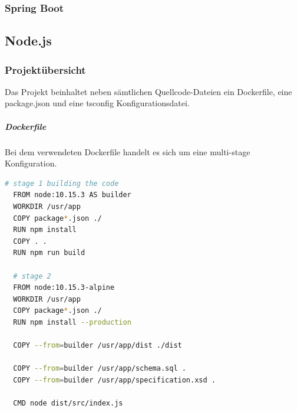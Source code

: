 \subsubsection{Spring Boot}



\subsection{Node.js}


\subsubsection{Projektübersicht}
Das Projekt beinhaltet neben sämtlichen Quellcode-Dateien ein Dockerfile, eine package.json und eine tsconfig Konfigurationsdatei. 

\subparagraph{Dockerfile}
Bei dem verwendeten Dockerfile handelt es sich um eine multi-stage Konfiguration. 

\begin{lstlisting}[language=bash]
  # stage 1 building the code
  FROM node:10.15.3 AS builder
  WORKDIR /usr/app
  COPY package*.json ./
  RUN npm install
  COPY . .
  RUN npm run build 
  
  # stage 2
  FROM node:10.15.3-alpine
  WORKDIR /usr/app
  COPY package*.json ./
  RUN npm install --production
  
  COPY --from=builder /usr/app/dist ./dist
  
  COPY --from=builder /usr/app/schema.sql .
  COPY --from=builder /usr/app/specification.xsd .
  
  CMD node dist/src/index.js
\end{lstlisting}

